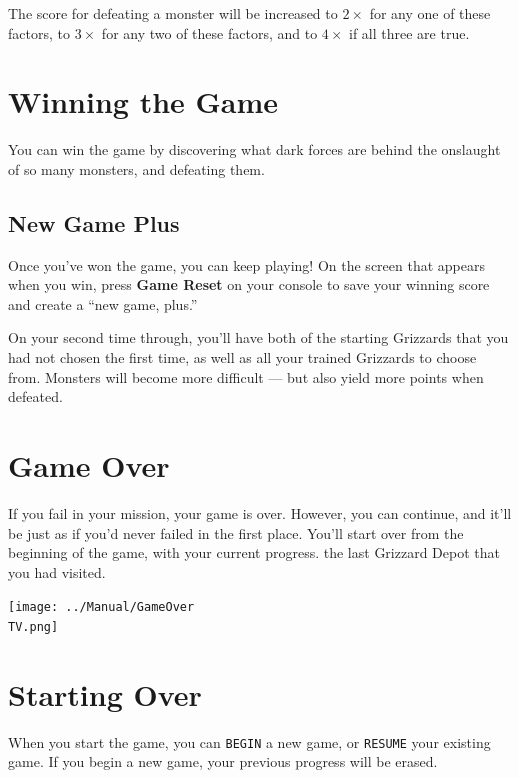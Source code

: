 \documentclass[10pt,twocolumn,openany,article]{memoir}
\newcommand\TV{NTSC}
\newcommand\TV{PAL}
\newcommand\TV{SECAM}
\begin{document}
The score for  defeating a monster will be increased  to $2\times$ for any
one of these  factors, to $3\times$ for  any two of these  factors, and to
$4\times$ if all three are true.

\section{Winning the Game}

You can  win the  game by  discovering what dark  forces are  behind the
onslaught of so many monsters, and defeating them.

\subsection*{New Game Plus}\label{sec:NewGamePlus}

Once  you've won  the game,  you can  keep playing!  On the  screen that
appears when you win, press \textbf{Game  Reset} on your console to save
your winning score and create a ``new game, plus.''

On your second time through, you'll  have both of the starting Grizzards
that you  had not  chosen the first  time, as well  as all  your trained
Grizzards to choose from. Monsters will become more difficult — but also
yield more points when defeated.

\section{Game Over}

If  you fail  in  your mission,  your  game is  over.  However, you  can
continue, and it'll be just as if you'd never failed in the first place.
You'll start over from \ifdefined\NOSAVE the beginning of the game, with
your  current progress.  \else  the  last Grizzard  Depot  that you  had
visited. \fi

\begin{center}
  \texttt{[image: ../Manual/GameOver\\TV.png]}
\end{center}

\section{Starting Over}\label{Starting Your Adventure Over}

\ifdefined\NOSAVE

When  you  start  the  game,  you can  \texttt{BEGIN}  a  new  game,  or
\texttt{RESUME}  your existing  game.  If  you begin  a  new game,  your
previous progress will be erased.
\end{document}
